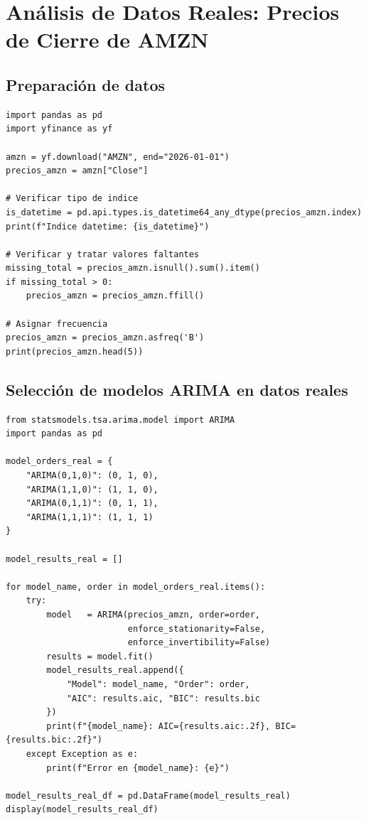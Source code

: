 \documentclass[12pt, a4paper]{article}
\begin{document}
\section{Análisis de Datos Reales: Precios de Cierre de AMZN}

\subsection{Preparación de datos}

\begin{lstlisting}
import pandas as pd
import yfinance as yf

amzn = yf.download("AMZN", end="2026-01-01")
precios_amzn = amzn["Close"]

# Verificar tipo de indice
is_datetime = pd.api.types.is_datetime64_any_dtype(precios_amzn.index)
print(f"Indice datetime: {is_datetime}")

# Verificar y tratar valores faltantes
missing_total = precios_amzn.isnull().sum().item()
if missing_total > 0:
    precios_amzn = precios_amzn.ffill()

# Asignar frecuencia
precios_amzn = precios_amzn.asfreq('B')
print(precios_amzn.head(5))
\end{lstlisting}

\subsection{Selección de modelos ARIMA en datos reales}

\begin{lstlisting}
from statsmodels.tsa.arima.model import ARIMA
import pandas as pd

model_orders_real = {
    "ARIMA(0,1,0)": (0, 1, 0),
    "ARIMA(1,1,0)": (1, 1, 0),
    "ARIMA(0,1,1)": (0, 1, 1),
    "ARIMA(1,1,1)": (1, 1, 1)
}

model_results_real = []

for model_name, order in model_orders_real.items():
    try:
        model   = ARIMA(precios_amzn, order=order,
                        enforce_stationarity=False,
                        enforce_invertibility=False)
        results = model.fit()
        model_results_real.append({
            "Model": model_name, "Order": order,
            "AIC": results.aic, "BIC": results.bic
        })
        print(f"{model_name}: AIC={results.aic:.2f}, BIC={results.bic:.2f}")
    except Exception as e:
        print(f"Error en {model_name}: {e}")

model_results_real_df = pd.DataFrame(model_results_real)
display(model_results_real_df)
\end{lstlisting}
\end{document}
